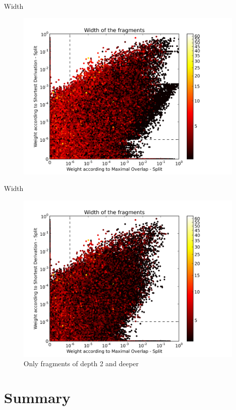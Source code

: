 \documentclass{beamer}
\begin{document}
\begin{frame}{Width}
\begin{figure}
\includegraphics[width=\linewidth,trim=0.5cm 0cm 2.5cm 0.5cm, clip=true]{../data/plots/6.png}
\end{figure}
\end{frame}
%
%
\begin{frame}{Width}
\begin{figure}
\includegraphics[width=\linewidth,trim=0.5cm 0cm 2.5cm 0.5cm, clip=true]{../data/plots/9.png}
\caption{Only fragments of depth 2 and deeper}
\end{figure}
\end{frame}

\section*{Summary}
\end{document}
